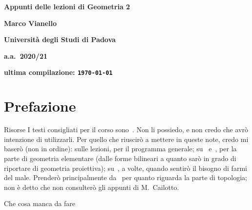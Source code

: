 \documentclass[a4paper]{amsproc}
\makeatletter
\theoremstyle{plain}
\theoremstyle{definition}
\theoremstyle{remark}
\def\paragraph{\@startsection{paragraph}{4}%
  \z@\z@{-\fontdimen2\font}%
  {\normalfont\bfseries}}
\makeatother
\begin{document}
\begin{titlepage}
  \centering
  \vfill
  {\Large\bfseries Appunti delle lezioni di Geometria 2\par}
  \vspace{.6cm}
  {\bfseries Marco Vianello\par}
  \vspace{.2cm}
  {\bfseries Università degli Studi di Padova\par}
  \vspace{.2cm}
  {\bfseries a.a.\ 2020/21\par}
  \vfill
  {\small\bfseries ultima compilazione: \texttt{\today}\par}
\end{titlepage}


\tableofcontents
\clearpage


\section*{Prefazione}
\lipsum[1]
\smallskip

\paragraph{Risorse}
I testi consigliati per il corso sono~\cite{sernesi2000geometria,sernesi2019geometria}. Non li possiedo, e non credo che avrò intenzione di utilizzarli. Per quello che riuscirò a mettere in queste note, credo mi baserò (non in ordine): sulle lezioni, per il programma generale; su~\cite{candilera2011algebra} e~\cite{barsotti1970appunti}, per la parte di geometria elementare (dalle forme bilineari a quanto sarò in grado di riportare di geometria proiettiva); su~\cite{suetin1997linear}, a volte, quando sentirò il bisogno di farmi del male. Prenderò principalmente da~\cite{manetti2014topologia} per quanto riguarda la parte di topologia; non è detto che non consulterò gli appunti di M.\ Cailotto.
\smallskip

\paragraph{Che cosa manca da fare}

\end{document}
